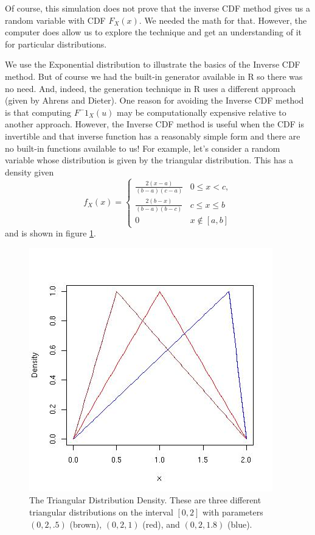 \documentclass{article}
\begin{document}
Of course, this simulation does not prove that the inverse CDF method
gives us a random variable with CDF $F_X(x)$.  We needed the math for
that. However, the computer does allow us to explore the technique and
get an understanding of it for particular distributions.

We use the Exponential distribution to illustrate the basics of the
Inverse CDF method. But of course we had the built-in generator
available in R so there was no need.  And, indeed, the generation
technique in R uses a different approach (given by Ahrens and Dieter).
One reason for avoiding the Inverse CDF method is that computing
$F^-1_X(u)$ may be computationally expensive relative to another
approach.  However, the Inverse CDF method is useful when the CDF is
invertible and that inverse function has a reasonably simple form and
there are no built-in functions available to us!  For example, let's
consider a random variable whose distribution is given by the
triangular distribution.  This has a density given
$$
  f_X(x) = 
  \begin{cases}%
   \frac{2(x - a)}{(b-a)(c-a)} & 0 \le x < c, \\
   \frac{2(b -x)}{(b-a)(b-c)} & c \le x \le b \\
   0 & x \not\in [a, b]    
  \end{cases}
$$
and is shown in figure \ref{fig:triangularDensity}.
\begin{figure}[htbp]
  \begin{center}
    \leavevmode
    \includegraphics{triangularDensity.jpg}
    \caption{The Triangular Distribution Density.
   These are three different triangular distributions
   on the  interval $[0, 2]$
    with parameters
    $(0, 2, .5)$ (brown), $(0, 2, 1)$ (red), and $(0, 2, 1.8)$ (blue).
   }
    \label{fig:triangularDensity}
  \end{center}
\end{figure}
\end{document}
